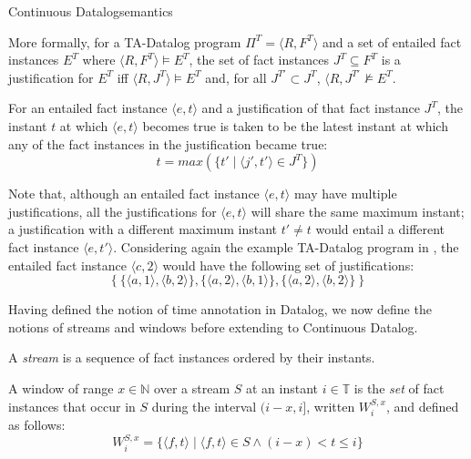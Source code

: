 \begin{nestedsection}{Continuous Datalog}{semantics}
\begin{definition}
More formally, for a TA-Datalog program $\Pi^T = \langle R, F^T \rangle$
and a set of entailed fact instances $E^T$ where $\langle R, F^T \rangle \models E^T$, the set of fact instances $J^T \subseteq F^T$ is a justification for
$E^T$ iff $\langle R, J^T \rangle \models E^T$ and, for all $J^{T\prime} \subset J^T$, $\langle R, J^{T\prime} \not\models E^T$.

For an entailed fact instance $\langle e, t\rangle$ and a
justification of that fact instance $J^T$, the instant $t$ at which
$\langle e, t \rangle$ becomes true is taken to be the latest instant
at which any of the fact instances in the justification became true:
\[ t = max(\{ t' \mid \langle j', t' \rangle \in J^T \}) \]

Note that, although an entailed fact instance $\langle e, t\rangle$
may have multiple justifications, all the justifications for $\langle
e, t \rangle$ will share the same maximum instant; a justification
with a different maximum instant $t' \neq t$ would entail a different
fact instance $\langle e, t' \rangle$. Considering again the example
TA-Datalog program in ,
the entailed fact instance $\langle c, 2 \rangle$ would have the
following set of justifications:
\[
  \{ \ \{ \langle a, 1 \rangle, \langle b, 2 \rangle \},  \{ \langle a, 2 \rangle, \langle b, 1 \rangle \},  \{ \langle a, 2 \rangle, \langle b, 2 \rangle \} \  \}
\]

\end{definition}

Having defined the notion of time annotation in Datalog, we now define
the notions of streams and windows before extending to Continuous Datalog.

\begin{definition}[Streams]
A {\em stream} is a sequence of fact instances ordered
by their instants.
\end{definition}

\begin{definition}[Window]

A window of range ${x \in \mathbb{N}}$ over a stream $S$ at an instant
${i \in \mathbb{T}}$ is the \emph{set} of fact instances that occur in
$S$ during the interval ${(i-x,i]}$, written ${W^{S,x}_{i}}$, and
defined as follows:
\[ W^{S,x}_i = \{ \langle f, t \rangle \mid \langle f, t \rangle \in S \land (i-x) < t \leqslant i \}\]  
\end{definition}


\end{nestedsection}
